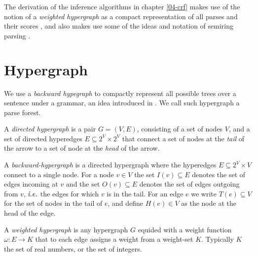 % 

The derivation of the inference algorithms in chapter \ref{04-crf} makes use of the notion of a \textit{weighted hypergraph} as a compact representation of all parses and their scores \citep{gallo1993directed,klein2004parsing}, and also makes use some of the ideas and notation of semiring parsing \citep{goodman1999semiring,eisner2009semirings}.


\section{Hypergraph}
  We use a \textit{backward hypegraph} to compactly represent all possible trees over a sentence under a grammar, an idea introduced in \citet{klein2004parsing}. We call such hypergraph a parse forest.

  \begin{definition}{}
    A \textit{directed hypergraph} is a pair $G = (V, E)$, consisting of a set of nodes $V$, and a set of directed hyperedges $E \subseteq 2^V \times 2^V$ that connect a set of nodes at the \textit{tail} of the arrow to a set of node at the \textit{head} of the arrow.
  \end{definition}

  \begin{definition}{}
    A \textit{backward-hypergraph} is a directed hypergraph where the hyperedges $E \subseteq 2^V \times V$ connect to a single node. For a node $v \in V$ the set $I(v) \subseteq E$ denotes the set of edges incoming at $v$ and the set $O(v) \subseteq E$ denotes the set of edges outgoing from $v$, $\emph{i.e.}$ the edges for which $v$ is in the tail. For an edge $e$ we write $T(e) \subseteq V$ for the set of nodes in the tail of $e$, and define $H(e) \in V$ as the node at the head of the edge.
  \end{definition}

  \begin{definition}{}
     A \textit{weighted hypergraph} is any hypergraph $G$ equided with a weight function $\omega : E \to K$ that to each edge assigns a weight from a weight-set $K$. Typically $K$ the set of real numbers, or the set of integers.
  \end{definition}


